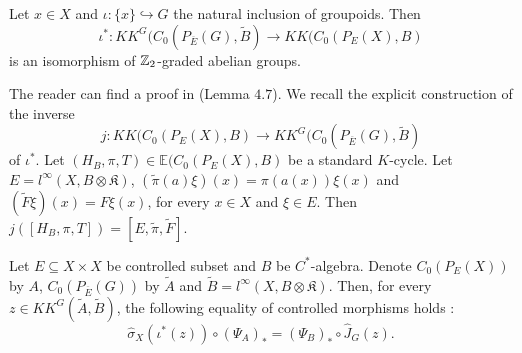 
\begin{lem}\label{iota}
Let $x\in X$ and $\iota : \{x\}\hookrightarrow G$ the natural inclusion of groupoids. Then 
\[\iota^* : KK^G(C_0(P_{\overline E}(G),\tilde B) \rightarrow KK(C_0(P_{E}(X),B) \]
is an isomorphism of $\mathbb Z_2$-graded abelian groups.
\end{lem}

The reader can find a proof in \cite{SkTuYu} (Lemma $4.7$). We recall the explicit construction of the inverse 
\[j:KK(C_0(P_{E}(X),B) \rightarrow KK^G(C_0(P_{\overline E}(G),\tilde B)\] 
of $\iota^*$. Let $(H_B,\pi,T)\in\mathbb E (C_0(P_{E}(X),B)$ be a standard $K$-cycle. Let $E= l^\infty(X,B\otimes\mathfrak K)$, $(\tilde \pi (a)\xi)(x) = \pi(a(x))\xi(x)$ and $(\tilde F\xi ) (x) = F\xi(x)$, for every $x\in X$ and $\xi\in E$. Then $j([H_B,\pi,T])=[E,\tilde \pi, \tilde F]$.

\begin{lem} Let $E\subseteq X\times X$ be controlled subset and $B$ be $C^*$-algebra. Denote $C_0(P_E(X))$ by $A$, $C_0(P_{\overline E}(G))$ by $\tilde A$ and $\tilde B = l^\infty(X,B\otimes \mathfrak K)$. Then, for every $z\in KK^G(\tilde A,\tilde B)$, the following equality of controlled morphisms holds :
\[\hat\sigma_X(\iota^*(z))\circ (\Psi_A)_* = (\Psi_B)_*\circ \hat J_G(z).\]  
\end{lem}


